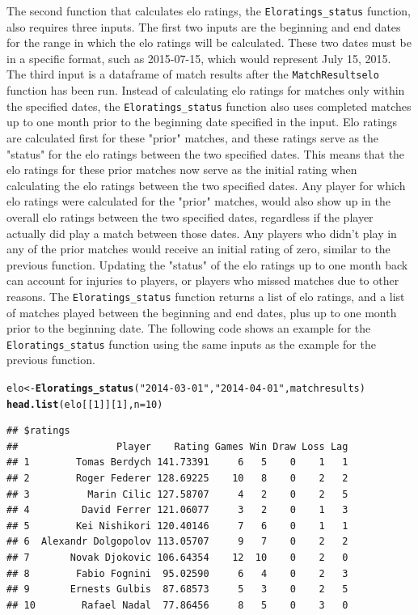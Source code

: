 \documentclass{article}\usepackage[]{graphicx}\usepackage[]{color}
\makeatletter
\newcommand{\hlnum}[1]{\textcolor[rgb]{0.686,0.059,0.569}{#1}}%
\newcommand{\hlstr}[1]{\textcolor[rgb]{0.192,0.494,0.8}{#1}}%
\newcommand{\hlstd}[1]{\textcolor[rgb]{0.345,0.345,0.345}{#1}}%
\newcommand{\hlkwb}[1]{\textcolor[rgb]{0.69,0.353,0.396}{#1}}%
\newcommand{\hlkwc}[1]{\textcolor[rgb]{0.333,0.667,0.333}{#1}}%
\newcommand{\hlkwd}[1]{\textcolor[rgb]{0.737,0.353,0.396}{\textbf{#1}}}%
\newenvironment{kframe}{%
 \def\at@end@of@kframe{}%
 \ifinner\ifhmode%
  \def\at@end@of@kframe{\end{minipage}}%
  \begin{minipage}{\columnwidth}%
 \fi\fi%
 \def\FrameCommand##1{\hskip\@totalleftmargin \hskip-\fboxsep
 \colorbox{shadecolor}{##1}\hskip-\fboxsep
     \hskip-\linewidth \hskip-\@totalleftmargin \hskip\columnwidth}%
 \MakeFramed {\advance\hsize-\width
   \@totalleftmargin\z@ \linewidth\hsize
   \@setminipage}}%
 {\par\unskip\endMakeFramed%
 \at@end@of@kframe}
\newenvironment{knitrout}{}{} %
\numberwithin{equation}{section} %
\makeatother
\begin{document}
The second function that calculates elo ratings, the \texttt{Eloratings\_status} function, also requires three inputs.  The first two inputs are the beginning and end dates for the range in which the elo ratings will be calculated.  These two dates must be in a specific format, such as 2015-07-15, which would represent July 15, 2015.  The third input is a dataframe of match results after the \texttt{MatchResultselo} function has been run.  Instead of calculating elo ratings for matches only within the specified dates, the \texttt{Eloratings\_status} function also uses completed matches up to one month prior to the beginning date specified in the input.  Elo ratings are calculated first for these "prior" matches, and these ratings serve as the "status" for the elo ratings between the two specified dates.  This means that the elo ratings for these prior matches now serve as the initial rating when calculating the elo ratings between the two specified dates.  Any player for which elo ratings were calculated for the "prior" matches, would also show up in the overall elo ratings between the two specified dates, regardless if the player actually did play a match between those dates.  Any players who didn't play in any of the prior matches would receive an initial rating of zero, similar to the previous function.  Updating the "status" of the elo ratings up to one month back can account for injuries to players, or players who missed matches due to other reasons.  The \texttt{Eloratings\_status} function returns a list of elo ratings, and a list of matches played between the beginning and end dates, plus up to one month prior to the beginning date.  The following code shows an example for the \texttt{Eloratings\_status} function using the same inputs as the example for the previous function.

\begin{knitrout}
\color{fgcolor}\begin{kframe}
\begin{alltt}
\hlstd{elo} \hlkwb{<-} \hlkwd{Eloratings_status}\hlstd{(}\hlstr{"2014-03-01"}\hlstd{,}\hlstr{"2014-04-01"}\hlstd{,matchresults)}
\hlkwd{head.list}\hlstd{(elo[[}\hlnum{1}\hlstd{]][}\hlnum{1}\hlstd{] ,}\hlkwc{n}\hlstd{=}\hlnum{10}\hlstd{)}
\end{alltt}
\begin{verbatim}
## $ratings
##                 Player    Rating Games Win Draw Loss Lag
## 1        Tomas Berdych 141.73391     6   5    0    1   1
## 2        Roger Federer 128.69225    10   8    0    2   2
## 3          Marin Cilic 127.58707     4   2    0    2   5
## 4         David Ferrer 121.06077     3   2    0    1   3
## 5        Kei Nishikori 120.40146     7   6    0    1   1
## 6  Alexandr Dolgopolov 113.05707     9   7    0    2   2
## 7       Novak Djokovic 106.64354    12  10    0    2   0
## 8        Fabio Fognini  95.02590     6   4    0    2   3
## 9       Ernests Gulbis  87.68573     5   3    0    2   5
## 10        Rafael Nadal  77.86456     8   5    0    3   0
\end{verbatim}
\end{kframe}
\end{knitrout}
\end{document}
